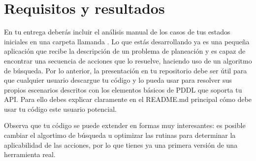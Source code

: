\section{Requisitos y resultados}

En tu entrega deberás incluir el análisis manual de los casos de tus estados iniciales en una carpeta llamanda .  Lo que estás desarrollando ya es una pequeña aplicación que recibe la descripción de un problema de planeación y es capaz de encontrar una secuencia de acciones que lo resuelve, haciendo uso de un algoritmo de búsqueda.  Por lo anterior, la presentación en tu repositorio debe ser útil para que cualquier usuario descargue tu código y lo pueda usar para resolver sus propios escenarios descritos con los elementos básicos de PDDL que soporta tu API.  Para ello debes explicar claramente en el README.md principal cómo debe usar tu código este usuario potencial.

Observa que tu código se puede extender en formas muy interesantes: es posible cambiar el algortimo de búsqueda u optimizar las rutinas para determinar la aplicabilidad de las acciones, por lo que tienes ya una primera versión de una herramienta real.
